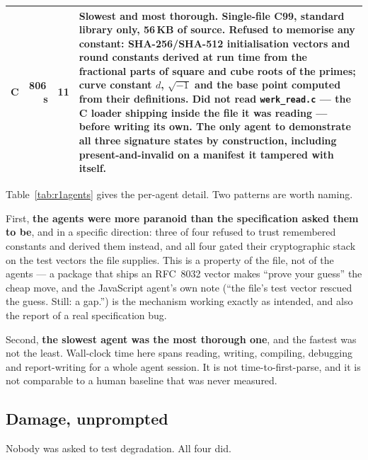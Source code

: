 \documentclass[10pt,twocolumn,letterpaper]{article}
\newcommand{\code}[1]{\texttt{\small #1}}
\begin{document}
\begin{table}[t]
\begin{tabular}{@{}lrrL{11.2cm}@{}}
C & 806\,s & 11 & Slowest and most thorough. Single-file C99, standard library only, 56\,KB of source. Refused to memorise any constant: SHA-256/SHA-512 initialisation vectors and round constants derived at run time from the fractional parts of square and cube roots of the primes; curve constant $d$, $\sqrt{-1}$ and the base point computed from their definitions. Did not read \code{werk\_read.c} --- the C loader shipping inside the file it was reading --- before writing its own. The only agent to demonstrate all three signature states by construction, including \textbf{present-and-invalid} on a manifest it tampered with itself. \\
\bottomrule
\end{tabular}
\end{table}

Table~\ref{tab:r1agents} gives the per-agent detail. Two patterns are worth
naming.

First, \textbf{the agents were more paranoid than the specification asked them to
be}, and in a specific direction: three of four refused to trust remembered
constants and derived them instead, and all four gated their cryptographic stack
on the test vectors the file supplies. This is a property of the file, not of the
agents --- a package that ships an RFC~8032 vector makes ``prove your guess'' the
cheap move, and the JavaScript agent's own note (``the file's test vector rescued
the guess. Still: a gap.'') is the mechanism working exactly as intended, and also
the report of a real specification bug.

Second, \textbf{the slowest agent was the most thorough one}, and the fastest was
not the least. Wall-clock time here spans reading, writing, compiling, debugging
and report-writing for a whole agent session. It is not time-to-first-parse, and
it is not comparable to a human baseline that was never measured.

\subsection{Damage, unprompted}

Nobody was asked to test degradation. All four did.
\end{document}
